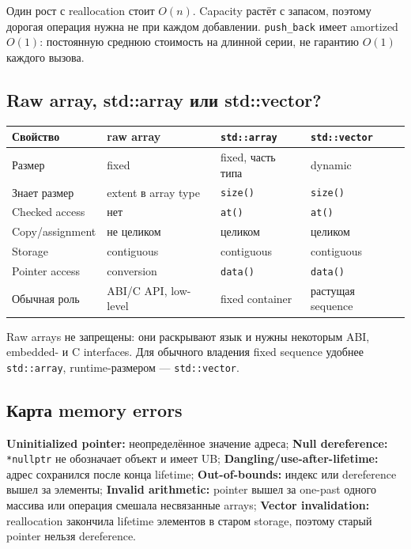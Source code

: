Один рост с reallocation стоит $O(n)$. Capacity растёт с запасом, поэтому
дорогая операция нужна не при каждом добавлении. \texttt{push\_back} имеет
amortized $O(1)$: постоянную среднюю стоимость на длинной серии, не гарантию
$O(1)$ каждого вызова.

\subsection{Raw array, std::array или std::vector?}

\begin{center}\small
\begin{tabularx}{\textwidth}{@{}lXXX@{}}
\toprule
Свойство & raw array & \texttt{std::array} & \texttt{std::vector} \\
\midrule
Размер & fixed & fixed, часть типа & dynamic \\
Знает размер & extent в array type & \texttt{size()} & \texttt{size()} \\
Checked access & нет & \texttt{at()} & \texttt{at()} \\
Copy/assignment & не целиком & целиком & целиком \\
Storage & contiguous & contiguous & contiguous \\
Pointer access & conversion & \texttt{data()} & \texttt{data()} \\
Обычная роль & ABI/C API, low-level & fixed container & растущая sequence \\
\bottomrule
\end{tabularx}
\end{center}

Raw arrays не запрещены: они раскрывают язык и нужны некоторым ABI,
embedded- и C interfaces. Для обычного владения fixed sequence удобнее
\texttt{std::array}, runtime-размером --- \texttt{std::vector}.

\subsection{Карта memory errors}

\textbf{Uninitialized pointer:} неопределённое значение адреса; \textbf{Null dereference:} \texttt{*nullptr} не обозначает объект и имеет UB; \textbf{Dangling/use-after-lifetime:} адрес сохранился после конца lifetime; \textbf{Out-of-bounds:} индекс или dereference вышел за элементы; \textbf{Invalid arithmetic:} pointer вышел за one-past одного массива или операция смешала несвязанные arrays; \textbf{Vector invalidation:} reallocation закончила lifetime элементов в старом storage, поэтому старый pointer нельзя dereference.

